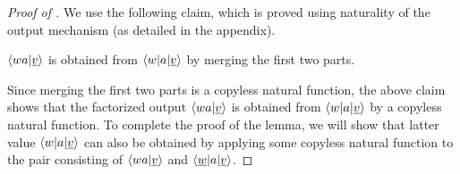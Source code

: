 \begin{proof}[Proof of ]
    We use the following claim, which is proved using naturality of the output mechanism (as detailed in the appendix).
    \begin{claim}\label{claim:merge-factorized-output}
        $\langle wa|\underline v \rangle$ is obtained from $\langle w|a|\underline v \rangle$ by merging the first two parts.
    \end{claim}

    Since merging the first two parts is a copyless natural function,  the above
    claim shows that  the factorized output $\langle wa|\underline v \rangle$ is
    obtained from $\langle w|a|\underline v \rangle$ by a copyless natural function. To
    complete the proof of the lemma, we will show that latter value
    $\langle w|a|\underline v \rangle$  can also be obtained by applying some copyless
    natural function to the pair consisting of  $\langle wa|\underline v \rangle$  and
    $\langle \underline w|a|\underline v \rangle$.


\end{proof}
